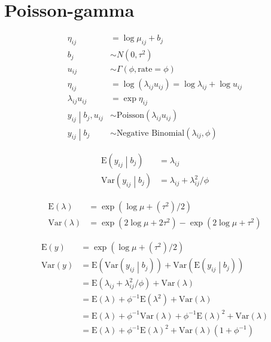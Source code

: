 \documentclass{article}
\begin{document}

\section{Poisson-gamma}
\begin{align*}
\eta_{ij} & = \log{\mu_{ij}} + b_j \\
b_j & \sim N\left(0, \tau^2\right) \\
u_{ij} & \sim \Gamma\left(\phi, \text{rate}=\phi\right) \\
\eta_{ij} & = \log{\left(\lambda_{ij} u_{ij} \right)} = \log{\lambda_{ij}} + \log{u_{ij}} \\
\lambda_{ij} u_{ij} & = \exp{\eta_{ij}} \\
\left.y_{ij} \middle| b_j, u_{ij}\right. & \sim \text{Poisson}\left(\lambda_{ij} u_{ij}\right) \\
\left.y_{ij} \middle| b_j \right. & \sim \text{Negative Binomial}\left(\lambda_{ij}, \phi\right)
\end{align*}

\begin{align*}
\text{E}\left(y_{ij} \middle| b_j\right) & = \lambda_{ij} \\
\text{Var}\left(y_{ij} \middle| b_j\right) & = \lambda_{ij} + \lambda_{ij}^2 / \phi
\end{align*}



\begin{align*}
\text{E}\left(\lambda\right) & = \exp{\left(\log{\mu}+\left(\tau^2\right) / 2\right)} \\
\text{Var}\left(\lambda\right) & = \exp{\left(2 \log{\mu} + 2\tau^2 \right)} - \exp{\left(2\log{\mu} + \tau^2 \right)}
\end{align*}

\begin{align*}
\text{E}\left(y\right) & = \exp{\left(\log{\mu}+\left(\tau^2\right) / 2\right)} \\
\text{Var}\left(y\right) & = \text{E}\left(\text{Var}\left(y_{ij} \middle| b_j \right)\right) +
                                 \text{Var}\left(\text{E}\left(y_{ij} \middle| b_j \right)\right) \\
                        & = \text{E}\left(\lambda_{ij} + \lambda_{ij}^2 / \phi\right) +
                            \text{Var}\left(\lambda\right) \\
                        & = \text{E}\left(\lambda\right)+\phi^{-1} \text{E}\left(\lambda^2\right) + \text{Var}\left(\lambda\right) \\
                        & = \text{E}\left(\lambda\right)+\phi^{-1}\text{Var}\left(\lambda\right) + \phi^{-1}\text{E}\left(\lambda\right)^2 + \text{Var}\left(\lambda\right) \\
                        & = \text{E}\left(\lambda\right) + \phi^{-1}\text{E}\left(\lambda\right)^2 + \text{Var}\left(\lambda\right)\left(1 + \phi^{-1}\right)
\end{align*}
\end{document}
